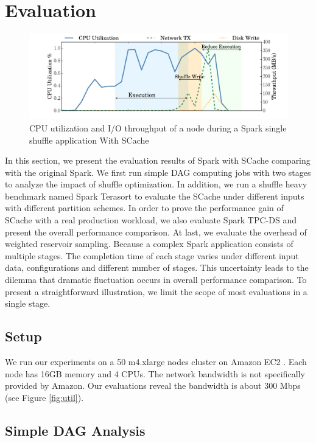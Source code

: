 \section{Evaluation}\label{evaluation}
\begin{figure}
	\includegraphics[width=\linewidth]{fig/scache_util}
	\caption{CPU utilization and I/O throughput of a node during a Spark single shuffle application With SCache}
	\label{fig:scache_util}
\end{figure}
In this section, we present the evaluation results of Spark with SCache comparing with the original Spark.
We first run simple DAG computing jobs with two stages to analyze the impact of shuffle optimization.
In addition, we run a shuffle heavy benchmark named Spark Terasort \cite{spark-tera} to evaluate the SCache under different inputs with different partition schemes.
In order to prove the performance gain of SCache with a real production workload, we also evaluate Spark TPC-DS \cite{sparktpcds} and present the overall performance comparison.
At last, we evaluate the overhead of weighted reservoir sampling. Because a complex Spark application consists of multiple stages. The completion time of each stage varies under different input data, configurations and different number of stages. This uncertainty leads to the dilemma that dramatic fluctuation occurs in overall performance comparison. To present a straightforward illustration, we limit the scope of most evaluations in a single stage.
\subsection{Setup}\label{stepup}
We run our experiments on a 50 m4.xlarge nodes cluster on Amazon EC2 \cite{aws}. Each node has 16GB memory and 4 CPUs. The network bandwidth is not specifically provided by Amazon. Our evaluations reveal the bandwidth is about 300 Mbps (see Figure \ref{fig:util}).

\subsection{Simple DAG Analysis}
